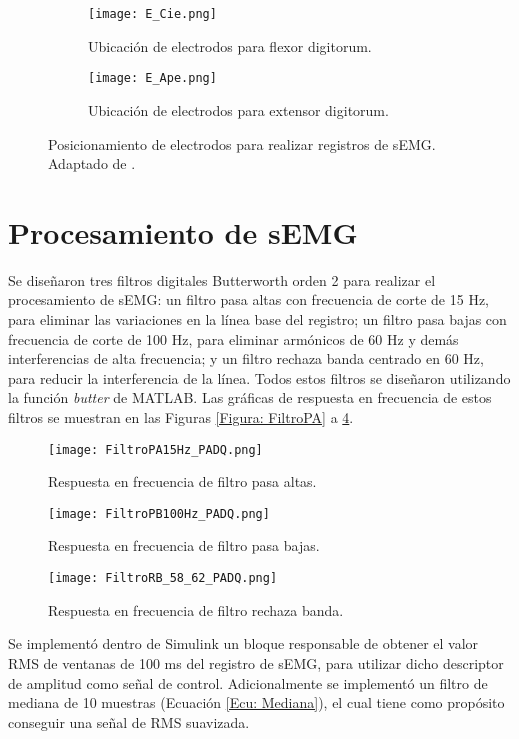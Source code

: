 \begin{figure}[htbp]
	\centering
	\begin{subfigure}[htbp]{0.3\textwidth}
		\texttt{[image: E\_Cie.png]}
		\caption{Ubicación de electrodos para flexor digitorum.}
		\label{Figura: E_Cie}
	\end{subfigure}
	\hfill
	\begin{subfigure}[htbp]{0.3\textwidth}
		\texttt{[image: E\_Ape.png]}
		\caption{Ubicación de electrodos para extensor digitorum.}
		\label{Figura: E_Ape}
	\end{subfigure}
	\caption[Posicionamiento de electrodos para registro de sEMG]{Posicionamiento de electrodos para realizar registros de sEMG. Adaptado de \cite{Cavalcanti-Garcia2009}.}
	\label{Figura: E_sEMG}
\end{figure}


\section{Procesamiento de sEMG}
Se diseñaron tres filtros digitales Butterworth orden 2 para realizar el procesamiento de sEMG: un filtro pasa altas con frecuencia de corte de 15 Hz, para eliminar las variaciones en la línea base del registro; un filtro pasa bajas con frecuencia de corte de 100 Hz, para eliminar armónicos de 60 Hz y demás interferencias de alta frecuencia; y un filtro rechaza banda centrado en 60 Hz, para reducir la interferencia de la línea. Todos estos filtros se diseñaron utilizando la función \emph{butter} de MATLAB. Las gráficas de respuesta en frecuencia de estos filtros se muestran en las Figuras \ref{Figura: FiltroPA} a \ref{Figura: FiltroRB}.

\begin{figure}[htbp]
	\centering
	\texttt{[image: FiltroPA15Hz\_PADQ.png]}
	\caption{Respuesta en frecuencia de filtro pasa altas.}
	\label{Figura: FiltroPA}
	
	\texttt{[image: FiltroPB100Hz\_PADQ.png]}
	\caption{Respuesta en frecuencia de filtro pasa bajas.} 
	\label{Figura: FiltroPB}
	
	\texttt{[image: FiltroRB\_58\_62\_PADQ.png]}
	\caption{Respuesta en frecuencia de filtro rechaza banda.}
	\label{Figura: FiltroRB}
\end{figure}

Se implementó dentro de Simulink un bloque responsable de obtener el valor RMS de ventanas de 100 ms del registro de sEMG, para utilizar dicho descriptor de amplitud como señal de control. Adicionalmente se implementó un filtro de mediana de 10 muestras (Ecuación \ref{Ecu: Mediana}), el cual tiene como propósito conseguir una señal de RMS suavizada.

